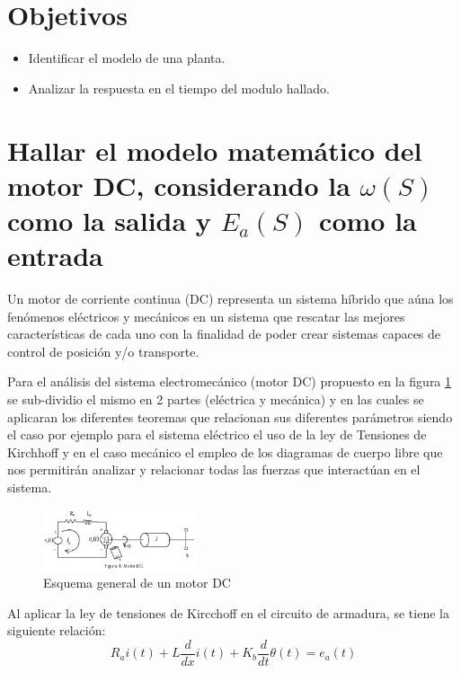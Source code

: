 \documentclass[conference]{IEEEtran}
\begin{document}
	\section{Objetivos}
	
	\begin{itemize}
		\item Identificar el modelo de una planta.
		\item Analizar la respuesta en el tiempo del modulo hallado.
	\end{itemize}
	
	\section{Hallar el modelo matemático del motor DC, considerando la $\omega (S)$ como la salida y $E_a(S)$ como la entrada}
	
	Un motor de corriente continua (DC) representa un sistema híbrido que aúna los fenómenos eléctricos y mecánicos en un sistema que rescatar las mejores características de cada uno con la finalidad de poder crear sistemas capaces de control de posición y/o transporte.
	
	Para el análisis del sistema electromecánico (motor DC) propuesto en la figura \ref{fig:motor-electromecanico} se sub-dividio el mismo en 2 partes (eléctrica y mecánica) y en las cuales se aplicaran los diferentes teoremas que relacionan sus diferentes parámetros siendo el caso por ejemplo para el sistema eléctrico el uso de la ley de Tensiones de Kirchhoff y en el caso mecánico el empleo de los diagramas de cuerpo libre que nos permitirán analizar y relacionar todas las fuerzas que interactúan en el sistema.
	
	\begin{figure}[h]
		\centering
		\includegraphics[width=0.4\textwidth]{media/motor-electromecanico}
		\caption{Esquema general de un motor DC}
		\label{fig:motor-electromecanico}
	\end{figure}
	
	Al aplicar la ley de tensiones de Kircchoff en el circuito de armadura, se tiene la siguiente relación:
	\begin{equation}
		R_ai(t) + L\frac{d}{dx} i(t) + K_b \frac{d}{dt} \theta (t) = e_a(t)
		\label{eq:malla-1}
	\end{equation}
	
\end{document}
